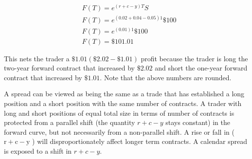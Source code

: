 \documentclass[11pt]{article}
\begin{document}
$$
\begin{aligned}
& F(T)=e^{(r+c-y) T} S \\
& F(T)=e^{(0.02+0.04-0.05) 1} \$ 100 \\
& F(T)=e^{(0.01) 1} \$ 100 \\
& F(T)=\$ 101.01
\end{aligned}
$$

This nets the trader a $\$ 1.01(\$ 2.02-\$ 1.01)$ profit because the trader is long the two-year forward contract that increased by $\$ 2.02$ and short the one-year forward contract that increased by $\$ 1.01$. Note that the above numbers are rounded.

A spread can be viewed as being the same as a trade that has established a long position and a short position with the same number of contracts. A trader with long and short positions of equal total size in terms of number of contracts is protected from a parallel shift (the quantity $r+c-y$ stays constant) in the forward curve, but not necessarily from a non-parallel shift. A rise or fall in ( $\mathrm{r}+\mathrm{c}-\mathrm{y}$ ) will disproportionately affect longer term contracts. A calendar spread is exposed to a shift in $r+c-y$.
\end{document}
